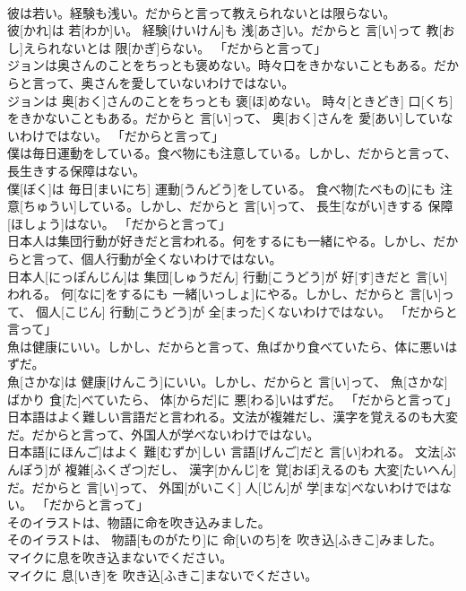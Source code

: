 \documentclass[8pt]{extreport}
\begin{document}
\begin{CJK}{UTF8}{min}
\\	彼は若い。経験も浅い。だからと言って教えられないとは限らない。	
\\	彼[かれ]は 若[わか]い。 経験[けいけん]も 浅[あさ]い。だからと 言[い]って 教[おし]えられないとは 限[かぎ]らない。	「だからと言って」
\\	ジョンは奥さんのことをちっとも褒めない。時々口をきかないこともある。だからと言って、奥さんを愛していないわけではない。	
\\	ジョンは 奥[おく]さんのことをちっとも 褒[ほ]めない。 時々[ときどき] 口[くち]をきかないこともある。だからと 言[い]って、 奥[おく]さんを 愛[あい]していないわけではない。	「だからと言って」
\\	僕は毎日運動をしている。食べ物にも注意している。しかし、だからと言って、長生きする保障はない。	
\\	僕[ぼく]は 毎日[まいにち] 運動[うんどう]をしている。 食べ物[たべもの]にも 注意[ちゅうい]している。しかし、だからと 言[い]って、 長生[ながい]きする 保障[ほしょう]はない。	「だからと言って」
\\	日本人は集団行動が好きだと言われる。何をするにも一緒にやる。しかし、だからと言って、個人行動が全くないわけではない。	
\\	日本人[にっぽんじん]は 集団[しゅうだん] 行動[こうどう]が 好[す]きだと 言[い]われる。 何[なに]をするにも 一緒[いっしょ]にやる。しかし、だからと 言[い]って、 個人[こじん] 行動[こうどう]が 全[まった]くないわけではない。	「だからと言って」
\\	魚は健康にいい。しかし、だからと言って、魚ばかり食べていたら、体に悪いはずだ。	
\\	魚[さかな]は 健康[けんこう]にいい。しかし、だからと 言[い]って、 魚[さかな]ばかり 食[た]べていたら、 体[からだ]に 悪[わる]いはずだ。	「だからと言って」
\\	日本語はよく難しい言語だと言われる。文法が複雑だし、漢字を覚えるのも大変だ。だからと言って、外国人が学べないわけではない。	
\\	日本語[にほんご]はよく 難[むずか]しい 言語[げんご]だと 言[い]われる。 文法[ぶんぽう]が 複雑[ふくざつ]だし、 漢字[かんじ]を 覚[おぼ]えるのも 大変[たいへん]だ。だからと 言[い]って、 外国[がいこく] 人[じん]が 学[まな]べないわけではない。	「だからと言って」
\\	そのイラストは、物語に命を吹き込みました。	
\\	そのイラストは、 物語[ものがたり]に 命[いのち]を 吹き込[ふきこ]みました。	
\\	マイクに息を吹き込まないでください。	
\\	マイクに 息[いき]を 吹き込[ふきこ]まないでください。	

\end{CJK}
\end{document}

